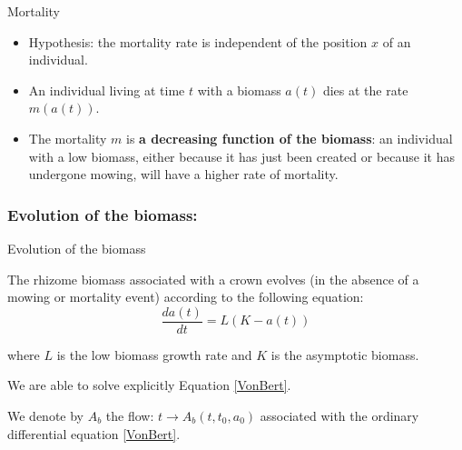 \documentclass{myBeamer}
\begin{document}
\begin{frame}{Mortality}

\begin{itemize}
\item Hypothesis: the mortality rate is independent of the position $x$ of an individual. \bigbreak
\item An individual living at time $t$ with a biomass $a(t)$ dies at the rate $m(a(t))$.
\bigbreak
\item The mortality $m$ is \textbf{a decreasing function of the biomass}: an individual with a low biomass, either because it has just been created or because it has undergone mowing, will have a higher rate of mortality.%
\end{itemize}
\end{frame}





\subsubsection*{Evolution of the biomass:}

\begin{frame}{Evolution of the biomass}

The rhizome biomass associated with a crown evolves (in the absence of a mowing or mortality event) according to the following equation:
\begin{equation}
\label{VonBert}
\frac{da(t)}{dt}= L  ( K - a(t) ) 
\end{equation}

where $L$ is the low biomass growth rate and $K$ is the asymptotic biomass.

\bigbreak 

We are able to solve explicitly Equation \eqref{VonBert}.

We denote by $A_b$ the flow: $ t \rightarrow A_b(t,t_0,a_0)$ associated with the ordinary differential equation \eqref{VonBert}.
\end{frame}



\end{document}
